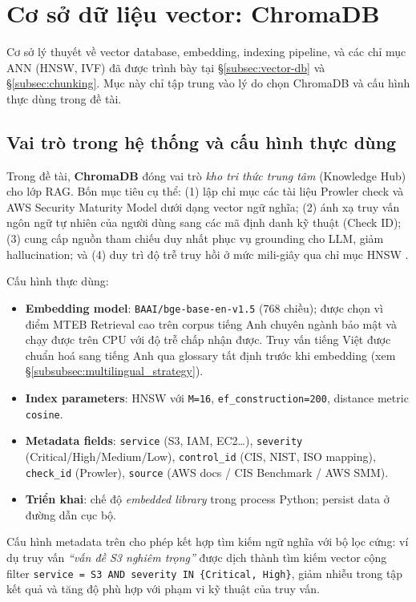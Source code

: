 \section{Cơ sở dữ liệu vector: ChromaDB}
\label{sec:chromadb_vector}

Cơ sở lý thuyết về vector database, embedding, indexing pipeline, và các chỉ mục ANN (HNSW, IVF) đã được trình bày tại §\ref{subsec:vector-db} và §\ref{subsec:chunking}. Mục này chỉ tập trung vào lý do chọn ChromaDB và cấu hình thực dùng trong đề tài.

\subsection{Vai trò trong hệ thống và cấu hình thực dùng}
\label{subsec:chromadb}

Trong đề tài, \textbf{ChromaDB} \cite{chromadb_docs} đóng vai trò \textit{kho tri thức trung tâm} (Knowledge Hub) cho lớp RAG. Bốn mục tiêu cụ thể: (1) lập chỉ mục các tài liệu Prowler check và AWS Security Maturity Model dưới dạng vector ngữ nghĩa; (2) ánh xạ truy vấn ngôn ngữ tự nhiên của người dùng sang các mã định danh kỹ thuật (Check ID); (3) cung cấp nguồn tham chiếu duy nhất phục vụ grounding cho LLM, giảm hallucination; và (4) duy trì độ trễ truy hồi ở mức mili-giây qua chỉ mục HNSW \cite{malkov2018hnsw}.

Cấu hình thực dùng:
\begin{itemize}
  \item \textbf{Embedding model}: \texttt{BAAI/bge-base-en-v1.5} (768 chiều); được chọn vì điểm MTEB Retrieval cao trên corpus tiếng Anh chuyên ngành bảo mật và chạy được trên CPU với độ trễ chấp nhận được. Truy vấn tiếng Việt được chuẩn hoá sang tiếng Anh qua glossary tất định trước khi embedding (xem §\ref{subsubsec:multilingual_strategy}).
  \item \textbf{Index parameters}: HNSW với \texttt{M=16}, \texttt{ef\_construction=200}, distance metric \texttt{cosine}.
  \item \textbf{Metadata fields}: \texttt{service} (S3, IAM, EC2\dots), \texttt{severity} (Critical/High/Medium/Low), \texttt{control\_id} (CIS, NIST, ISO mapping), \texttt{check\_id} (Prowler), \texttt{source} (AWS docs / CIS Benchmark / AWS SMM).
  \item \textbf{Triển khai}: chế độ \textit{embedded library} trong process Python; persist data ở đường dẫn cục bộ.
\end{itemize}

Cấu hình metadata trên cho phép kết hợp tìm kiếm ngữ nghĩa với bộ lọc cứng: ví dụ truy vấn \textit{``vấn đề S3 nghiêm trọng''} được dịch thành tìm kiếm vector cộng filter \texttt{service = S3 AND severity IN \{Critical, High\}}, giảm nhiễu trong tập kết quả và tăng độ phù hợp với phạm vi kỹ thuật của truy vấn.


